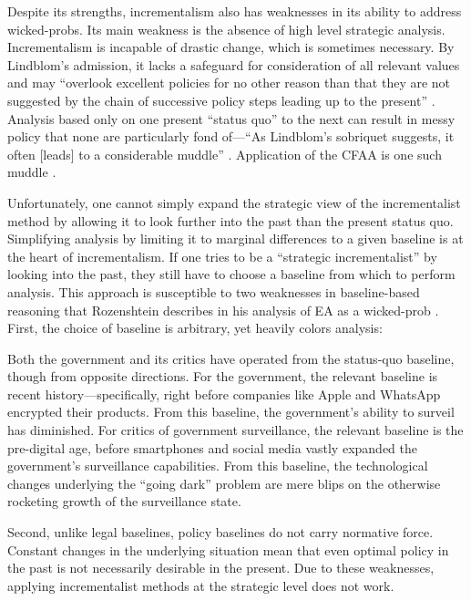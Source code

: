 Despite its strengths, \ac{incrementalism} also has weaknesses in its ability to address \acp{wicked-prob}. Its main
weakness is the absence of high level strategic analysis. Incrementalism is incapable of drastic change, which is
sometimes necessary. By Lindblom's admission, it lacks a safeguard for consideration of all relevant values and may
``overlook excellent policies for no other reason than that they are not suggested by the chain of successive policy
steps leading up to the present'' \cite{lindblom_muddling_1959}. Analysis based only on one present ``status quo'' to
the next can result in messy policy that none are particularly fond of---``As Lindblom's sobriquet suggests, it often
[leads] to a considerable muddle'' \cite{feeley_judicial_2000}. Application of the \acl{CFAA} is one such muddle
\cite{wolff_computer_2016}.

Unfortunately, one cannot simply expand the strategic view of the incrementalist method by allowing it to look further
into the past than the present status quo. Simplifying analysis by limiting it to marginal differences to a given
baseline is at the heart of \ac{incrementalism}. If one tries to be a ``strategic incrementalist'' by looking into the
past, they still have to choose a baseline from which to perform analysis. This approach is susceptible to two
weaknesses in baseline-based reasoning that Rozenshtein describes in his analysis of \ac{EA} as a \ac{wicked-prob}
\cite{rozenshtein_wicked_2018}. First, the choice of baseline is arbitrary, yet heavily colors analysis:

\begin{displayquote}
Both the government and its critics have operated from the status-quo baseline, though from opposite directions. For the
government, the relevant baseline is recent history---specifically, right before companies like Apple and WhatsApp
encrypted their products. From this baseline, the government's ability to surveil has diminished. For critics of
government surveillance, the relevant baseline is the pre-digital age, before smartphones and social media vastly
expanded the government's surveillance capabilities. From this baseline, the technological changes underlying the
``going dark'' problem are mere blips on the otherwise rocketing growth of the surveillance state.
\cite{rozenshtein_wicked_2018}
\end{displayquote}

Second, unlike legal baselines, policy baselines do not carry normative force. Constant changes in the underlying
situation mean that even optimal policy in the past is not necessarily desirable in the present. Due to these
weaknesses, applying incrementalist methods at the strategic level does not work.

